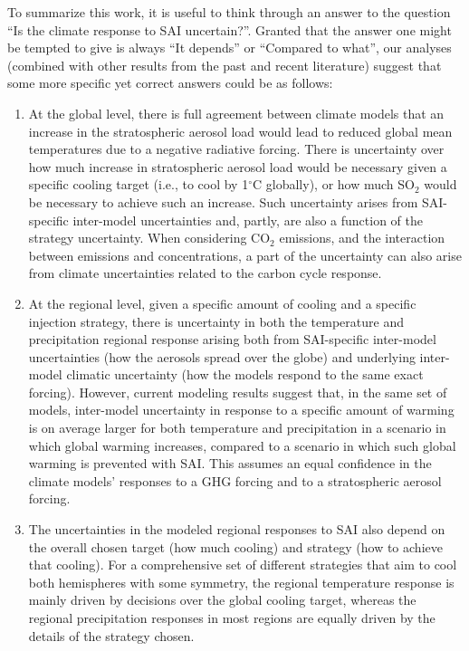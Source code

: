 \documentclass[draft]{agujournal2019}
\begin{document}
To summarize this work, it is useful to think through an answer to the question ``Is the climate response to SAI uncertain?''. Granted that the answer one might be tempted to give is always ``It depends'' or ``Compared to what'', our analyses (combined with other results from the past and recent literature) suggest that some more specific yet correct answers could be as follows:

\begin{enumerate}
    \item At the global level, there is full agreement between climate models that an increase in the stratospheric aerosol load would lead to reduced global mean temperatures due to a negative radiative forcing. There is uncertainty over how much increase in stratospheric aerosol load would be necessary given a specific cooling target (i.e., to cool by 1$^{\circ}$C globally), or how much SO$_2$ would be necessary to achieve such an increase. Such uncertainty arises from SAI-specific inter-model uncertainties and, partly, are also a function of the strategy uncertainty. When considering CO$_2$ emissions, and the interaction between emissions and concentrations, a part of the uncertainty can also arise from climate uncertainties related to the carbon cycle response.
    \item At the regional level, given a specific amount of cooling and a specific injection strategy, there is uncertainty in both the temperature and precipitation regional response arising both from SAI-specific inter-model uncertainties (how the aerosols spread over the globe) and underlying inter-model climatic uncertainty (how the models respond to the same exact forcing). However, current modeling results suggest that, in the same set of models, inter-model uncertainty in response to a specific amount of warming is on average larger for both temperature and precipitation in a scenario in which global warming increases, compared to a scenario in which such global warming is prevented with SAI. This assumes an equal confidence in the climate models' responses to a GHG forcing and to a stratospheric aerosol forcing.
    \item The uncertainties in the modeled regional responses to SAI also depend on the overall chosen target (how much cooling) and strategy (how to achieve that cooling). For a comprehensive set of different strategies that aim to cool both hemispheres with some symmetry, the regional temperature response is mainly driven by decisions over the global cooling target, whereas the regional precipitation responses in most regions are equally driven by the details of the strategy chosen.
\end{enumerate}
\end{document}
